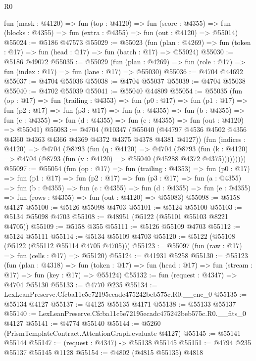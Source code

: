 \begin{lexlean}{R0}
\begin{coremodule}
    fun (mask : @4120) =>
    fun (top : @4120) =>
    fun (score : @4355) =>
    fun (blocks : @4355) => fun (extra : @4355) => fun (out : @4120) => @55014)
@55024 := @5186 @47573
@55029 := @55023
    (fun (plan : @4269) => fun (token : @17) => fun (head : @17) => fun (batch : @17) => @55024)
@55030 := @5186 @49072
@55035 := @55029
    (fun (plan : @4269) => fun (role : @17) => fun (index : @17) => fun (lane : @17) => @55030)
@55036 := @4704 @44692
@55037 := @4704 @55036
@55038 := @4704 @55037
@55039 := @4704 @55038
@55040 := @4702 @55039
@55041 := @55040 @44809
@55054 := @55035
    (fun (op : @17) =>
    fun (trailing : @4353) =>
    fun (p0 : @17) =>
    fun (p1 : @17) =>
    fun (p2 : @17) =>
    fun (p3 : @17) =>
    fun (a : @4355) =>
    fun (b : @4355) =>
    fun (c : @4355) => fun (d : @4355) => fun (e : @4355) => fun (out : @4120) => @55041)
@55083 := @4704
    (@10347
      (@55040 (@44797 @4536 @4502 @4356 @4360 @4363 @4366 @4369 @4372 @4375 @4378 @4381 @4127))
      (fun (indices : @4120) =>
      @4704
        (@8793
          (fun (q : @4120) =>
          @4704
            (@8793
              (fun (k : @4120) =>
              @4704 (@8793 (fun (v : @4120) => @55040 (@45288 @4372 @4375)))))))))
@55097 := @55054
    (fun (op : @17) =>
    fun (trailing : @4353) =>
    fun (p0 : @17) =>
    fun (p1 : @17) =>
    fun (p2 : @17) =>
    fun (p3 : @17) =>
    fun (a : @4355) =>
    fun (b : @4355) =>
    fun (c : @4355) =>
    fun (d : @4355) => fun (e : @4355) => fun (rows : @4355) => fun (out : @4120) => @55083)
@55098 := @5158 @4127
@55100 := @5126 @55098 @4703
@55101 := @5124 @55100
@55103 := @5134 @55098 @4703
@55108 := @48951 (@5122 (@55101 @55103 @8221 @4705))
@55109 := @5158 @355
@55111 := @5126 @55109 @4703
@55112 := @5124 @55111
@55114 := @5134 @55109 @4703
@55120 := @5122 (@55108 (@5122 (@55112 @55114 @4705 @4705)))
@55123 := @55097 (fun (raw : @17) => fun (cells : @17) => @55120)
@55124 := @41931 @5258
@55130 := @55123
    (fun (plan : @4318) =>
    fun (token : @17) => fun (head : @17) => fun (stream : @17) => fun (key : @17) => @55124)
@55132 := fun (request : @4347) => @4704 @55130
@55133 := @4770 @235
@55134 := LexLeanPreserve.Cfcba11c5e72195ecadc475242beb575c.R0.__enc_0
@55135 := @55134 @4127
@55137 := @4125 @55135 @4171
@55138 := @55133 @55137
@55140 := LexLeanPreserve.Cfcba11c5e72195ecadc475242beb575c.R0.__fits_0 @4127
@55141 := @4774 @55140
@55144 := @5260 (PrismTemplateContract.AttentionGraph.evaluate @4127)
@55145 := @55141 @55144
@55147 := (request : @4347) -> @55138 @55145
@55151 := @4794 @235 @55137 @55145 @1128
@55154 := @4802 (@4815 @55135) @4818

\end{coremodule}
\end{lexlean}
